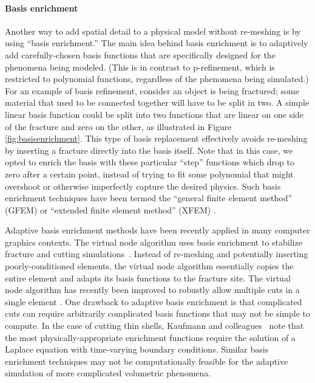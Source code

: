 \paragraph*{Basis enrichment}

Another way to add spatial detail to a physical model without re-meshing is by using ``basis enrichment.'' The main idea behind basis enrichment is to adaptively add carefully-chosen basis functions that are specifically designed for the phenomena being modeled. (This is in contrast to p-refinement, which is restricted to polynomial functions, regardless of the phenomena being simulated.) For an example of basis refinement, consider an object is being fractured; some material that used to be connected together will have to be split in two. A simple linear basis function could be split into two functions that are linear on one side of the fracture and zero on the other, as illustrated in Figure \ref{fig:basisenrichment}. This type of basis replacement effectively avoids re-meshing by inserting a fracture directly into the basis itself. Note that in this case, we opted to enrich the basis with these particular ``step'' functions which drop to zero after a certain point, instead of trying to fit some polynomial that might overshoot or otherwise imperfectly capture the desired physics. Such basis enrichment techniques have been termed the ``general finite element method'' (GFEM) or ``extended finite element method'' (XFEM) \cite{belytschko2009review}.

Adaptive basis enrichment methods have been recently applied in many computer graphics contexts.
The virtual node algorithm uses basis enrichment to stabilize fracture and cutting simulations~\cite{molino2005virtual,hegemann2013level}. Instead of re-meshing and potentially inserting poorly-conditioned elements, the virtual node algorithm essentially copies the entire element and adapts its basis functions to the fracture site. The virtual node algorithm  has recently been improved to robustly allow multiple cuts in a single element \cite{sifakis2007arbitrary,wang2014adaptive}. One drawback to adaptive basis enrichment is that complicated cuts can require arbitrarily complicated basis functions that may not be simple to compute. In the case of cutting thin shells, Kaufmann and colleagues~\cite{kaufmann2009enrichment} note that the most physically-appropriate enrichment functions require the solution of a Laplace equation with time-varying boundary conditions. Similar basis enrichment techniques may not be computationally feasible for the adaptive simulation of more complicated volumetric phenomena.

